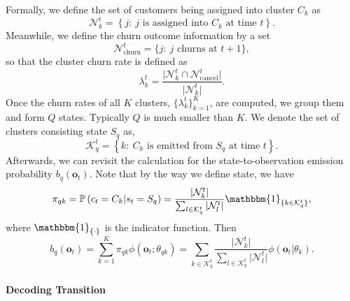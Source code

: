 Formally, we define the set of customers being assigned into cluster $C_k$ as
\begin{equation}
\mathcal{N}_k^t = \left\lbrace j :~ j \text{ is assigned into } C_k \text{ at time } t \right\rbrace.
\end{equation}
Meanwhile, we define the churn outcome information by a set
\begin{equation}
\mathcal{N}_\text{churn}^t = \{j: ~j \text{ churns at } t+1 \},
\end{equation}
so that the cluster churn rate is defined as
\begin{equation}
\lambda_k^t = \frac{\vert \mathcal{N}_k^t \cap \mathcal{N}_\text{cancel}^t \vert}{\vert  \mathcal{N}_k^t \vert}.
\label{eq:clusterChurn}
\end{equation}
Once the churn rates of all $K$ clusters, $\{ \lambda_k^t \}_{k=1}^K$, are computed, we group them and form $Q$ states. Typically $Q$ is much smaller than $K$. We denote the set of clusters consisting state $S_q$ as,
\begin{equation}
\mathcal{K}_q^t = \left\lbrace k :~ C_k \text{ is emitted from } S_q \text{ at time } t \right\rbrace.
\end{equation}
Afterwards, we can revisit the calculation for the state-to-observation emission probability $b_q(\mathbf{o}_t)$. Note that by the way we define state, we have
\begin{equation}
\pi_{qk} = \mathbb{P} \left( c_t = C_k | s_t = S_q \right) = \frac{\vert \mathcal{N}_k^t \vert}{\sum_{l \in \mathcal{K}_q^t} \vert \mathcal{N}_l^t \vert} \mathbbm{1}_{\{ k \in \mathcal{K}_q^t \}},
\end{equation}
where $\mathbbm{1}_{\{\cdot\}}$ is the indicator function. Then
\begin{equation}
b_q (\mathbf{o}_t) = \sum_{k=1}^K \pi_{qk} \phi(\mathbf{o}_t ; \theta_{qk}) = \sum_{ k \in \mathcal{K}_q^t } \frac{\vert \mathcal{N}_k^t \vert}{\sum_{l \in \mathcal{K}_q^t} \vert \mathcal{N}_l^t \vert} \phi(\mathbf{o}_t | \theta_{k}).
\end{equation}

\paragraph*{Decoding Transition}

